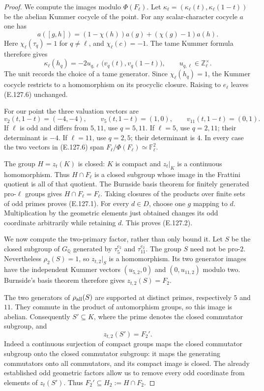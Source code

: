 \begin{proof}
We compute the images modulo $\Phi(F_\ell)$.  Let
$\kappa_\ell=(\kappa_\ell(t),\kappa_\ell(1-t))$ be
the abelian Kummer cocycle of the point.  For any
scalar-character cocycle $a$ one has
\[
 a([g,h])=(1-\chi(h))a(g)+(\chi(g)-1)a(h).
\]
Here $\chi_\ell(\tau_q)=1$ for $q\ne\ell$, and
$\chi_\ell(c)=-1$.  The tame Kummer formula therefore
gives
\[
 \kappa_\ell(h_q)=-2u_{q,\ell}\,
             \bigl(v_q(t),v_q(1-t)\bigr),
 \qquad u_{q,\ell}\in\mathbb Z_\ell^\times .           \tag{E.127.6}
\]
The unit records the choice of a tame generator.
Since $\chi_\ell(h_q)=1$, the Kummer cocycle restricts
to a homomorphism on its procyclic closure.  Raising to
$e_\ell$ leaves (E.127.6) unchanged.

For our point the three valuation vectors are
\[
       v_2(t,1-t)=(-4,-4),\qquad
       v_5(t,1-t)=(1,0),\qquad
       v_{11}(t,1-t)=(0,1).                            \tag{E.127.7}
\]
If $\ell$ is odd and differs from $5,11$, use $q=5,11$.
If $\ell=5$, use $q=2,11$; their determinant is $-4$.
If $\ell=11$, use $q=2,5$; their determinant is $4$.
In every case the two vectors in (E.127.6) span
$F_\ell/\Phi(F_\ell)\simeq\mathbb F_\ell^2$.

The group $H=z_t(K)$ is closed: $K$ is compact and
$z_t|_K$ is a continuous homomorphism.  Thus
$H\cap F_\ell$ is a closed subgroup whose image in
the Frattini quotient is all of that quotient.  The
Burnside basis theorem for finitely generated pro-$\ell$
groups gives $H\cap F_\ell=F_\ell$.  Taking closures
of the products over finite sets of odd primes proves
(E.127.1).  For every $d\in D$, choose one $g$ mapping
to $d$.  Multiplication by the geometric elements just
obtained changes its odd coordinate arbitrarily while
retaining $d$.  This proves (E.127.2).

We now compute the two-primary factor, rather than only
bound it.  Let $S$ be the closed subgroup of $G_{\mathbb Q}$
generated by $\tau_5^{e_2}$ and $\tau_{11}^{e_2}$.
The group $S$ need not be pro-$2$.  Nevertheless
$\rho_2(S)=1$, so $z_{t,2}|_S$ is a homomorphism.
Its two generator images have the independent Kummer
vectors $(u_{5,2},0)$ and $(0,u_{11,2})$ modulo two.
Burnside's basis theorem therefore gives
$z_{t,2}(S)=F_2$.

The two generators of $\rho_{\rm all}(S)$ are supported
at distinct primes, respectively $5$ and $11$.  They
commute in the product of automorphism groups, so this
image is abelian.  Consequently $S'\subseteq K$, where
the prime denotes the closed commutator subgroup, and
\[
                     z_{t,2}(S')=F_2'.
                                                        \tag{E.127.8}
\]
Indeed a continuous surjection of compact groups maps
the closed commutator subgroup onto the closed commutator
subgroup: it maps the generating commutators onto all
commutators, and its compact image is closed.
The already established odd geometric factors allow us
to remove every odd coordinate from elements of $z_t(S')$.
Thus $F_2'\subseteq H_2:=H\cap F_2$.


\end{proof}
